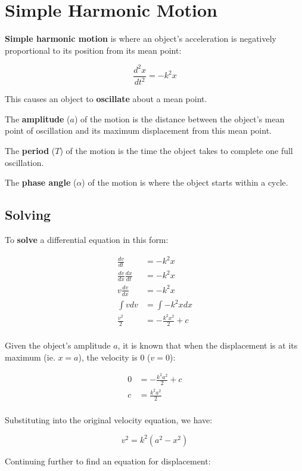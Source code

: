 \documentclass[a4paper,11pt]{report}
\begin{document}
\section{Simple Harmonic Motion}

\textbf{Simple harmonic motion} is where an object's acceleration is negatively
proportional to its position from its mean point:

$$
\frac{d^2x}{dt^2} = -k^2 x
$$

This causes an object to \textbf{oscillate} about a mean point.

The \textbf{amplitude} ($a$) of the motion is the distance between the object's
mean point of oscillation and its maximum displacement from this mean point.

The \textbf{period} ($T$) of the motion is the time the object takes to
complete one full oscillation.

The \textbf{phase angle} ($\alpha$) of the motion is where the object starts
within a cycle.

\subsection{Solving}

To \textbf{solve} a differential equation in this form:

$$
\begin{aligned}
\frac{dv}{dt} & = -k^2 x \\
\frac{dv}{dx} \frac{dx}{dt} & = -k^2 x \\
v \frac{dv}{dx} & = -k^2 x \\
\int v dv & = \int -k^2 x dx \\
\frac{v^2}{2} & = -\frac{k^2 x^2}{2} + c \\
\end{aligned}
$$

Given the object's amplitude $a$, it is known that when the displacement is at
its maximum (ie. $x = a$), the velocity is 0 ($v = 0$):

$$
\begin{aligned}
0 & = -\frac{k^2 a^2}{2} + c \\
c & = \frac{k^2 a^2}{2} \\
\end{aligned}
$$

Substituting into the original velocity equation, we have:

$$
v^2 = k^2(a^2 - x^2)
$$

Continuing further to find an equation for displacement:
\end{document}
